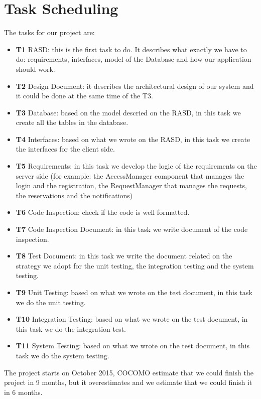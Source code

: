 \documentclass[18pt,oneside,a4paper, titlepage]{article}
\begin{document}
\section{Task Scheduling}
	The tasks for our project are:
	\begin{itemize}
		\item \textbf{T1} RASD: this is the first task to do. It describes what exactly we have to do: requirements, interfaces, model of the Database and how our application should work.
		\item \textbf{T2} Design Document: it describes the architectural design of our system and it could be done at the same time of the T3.
		\item \textbf{T3} Database: based on the model descried on the RASD, in this task we create all the tables in the database.
		\item \textbf{T4} Interfaces: based on what we wrote on the RASD, in this task we create the interfaces for the client side.
		\item \textbf{T5} Requirements: in this task we develop the logic of the requirements on the server side (for example: the AccessManager component that manages the login and the registration, the RequestManager that manages the requests, the reservations and the notifications)
		\item \textbf{T6} Code Inspection: check if the code is well formatted.
		\item \textbf{T7} Code Inspection Document: in this task we write document of the code inspection.
		\item \textbf{T8} Test Document: in this task we write the document related on the strategy we adopt for the unit testing, the integration testing and the system testing.
		\item \textbf{T9} Unit Testing: based on what we wrote on the  test document, in this task we do the unit testing.
		\item \textbf{T10} Integration Testing: based on what we wrote on the test document, in this task we do the integration test.
		\item \textbf{T11} System Testing: based on what we wrote on the  test document, in this task we do the system testing.
	\end{itemize}
	The project starts on October 2015, COCOMO estimate that we could finish the project in 9 months, but it overestimates and we estimate that we could finish it in 6 months.
	
\end{document}
